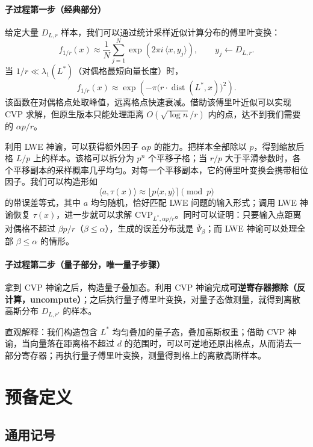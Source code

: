 \documentclass[11pt,a4paper]{article}
\newcommand{\Psibar}{\overline{\Psi}}
\begin{document}
\paragraph*{子过程第一步（经典部分）}

给定大量 $D_{L,r}$ 样本，我们可以通过统计采样近似计算分布的傅里叶变换：
\[
  f_{1/r}(x)\approx \frac{1}{N}\sum_{j=1}^{N}\exp\!\left(2\pi i\,\langle x,y_{j}\rangle\right),
  \qquad y_{j}\leftarrow D_{L,r}.
\]
当 $1/r\ll\lambda_{1}(L^{*})$（对偶格最短向量长度）时，
\[
  f_{1/r}(x)\approx \exp\!\left(-\pi\bigl(r\cdot\operatorname{dist}(L^{*},x)\bigr)^{2}\right).
\]
该函数在对偶格点处取峰值，远离格点快速衰减。借助该傅里叶近似可以实现 CVP 求解，但原生版本只能处理距离 $O(\sqrt{\log n}/r)$ 内的点，达不到我们需要的 $\alpha p/r$。

利用 LWE 神谕，可以获得额外因子 $\alpha p$ 的能力。把样本全部除以 $p$，得到缩放后格 $L/p$ 上的样本。该格可以拆分为 $p^{n}$ 个平移子格；当 $r/p$ 大于平滑参数时，各个平移副本的采样概率几乎均匀。对每一个平移副本，它的傅里叶变换会携带相位因子。我们可以构造形如
\[
  \langle a,\tau(x)\rangle \approx \bigl\lfloor p\langle x,y\rangle\bigr\rceil \pmod{p}
\]
的带误差等式，其中 $a$ 均匀随机，恰好匹配 LWE 问题的输入形式；调用 LWE 神谕恢复 $\tau(x)$，进一步就可以求解 $\mathrm{CVP}_{L^{*},\alpha p/r}$。同时可以证明：只要输入点距离对偶格不超过 $\beta p/r$（$\beta\le\alpha$），生成的误差分布就是 $\Psibar_{\beta}$；而 LWE 神谕可以处理全部 $\beta\le\alpha$ 的情形。

\paragraph*{子过程第二步（量子部分，唯一量子步骤）}

拿到 CVP 神谕之后，构造量子叠加态。利用 CVP 神谕完成\textbf{可逆寄存器擦除（反计算，uncompute）}；之后执行量子傅里叶变换，对量子态做测量，就得到离散高斯分布 $D_{L,r'}$ 的样本。

直观解释：我们构造包含 $L^{*}$ 均匀叠加的量子态，叠加高斯权重；借助 CVP 神谕，当向量落在距离格不超过 $d$ 的范围时，可以可逆地还原出格点，从而消去一部分寄存器；再执行量子傅里叶变换，测量得到格上的离散高斯样本。

\section{预备定义}

\subsection{通用记号}
\end{document}
